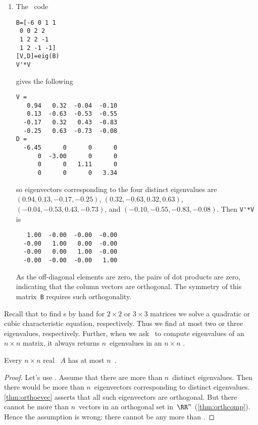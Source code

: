 \begin{example}
\begin{solution}
\begin{enumerate}
\item The \script\ code 
\setbox\ajrqrbox\hbox{}%
\marginajrbox%
\begin{verbatim}
B=[-6 0 1 1
 0 0 2 2
 1 2 2 -1
 1 2 -1 -1]
[V,D]=eig(B)
V'*V
\end{verbatim}
gives the following \twodp
\begin{verbatim}
V =
   0.94   0.32  -0.04  -0.10
   0.13  -0.63  -0.53  -0.55
  -0.17   0.32   0.43  -0.83
  -0.25   0.63  -0.73  -0.08
D =
  -6.45      0      0      0
      0  -3.00      0      0
      0      0   1.11      0
      0      0      0   3.34
\end{verbatim}
so eigenvectors corresponding to the four distinct eigenvalues are
\((0.94,0.13,-0.17,-0.25)\), \((0.32,-0.63,0.32,0.63)\), \((-0.04,-0.53,0.43,-0.73)\), and \((-0.10,-0.55,-0.83,-0.08)\).
Then \verb|V'*V| is \twodp
\begin{verbatim}
   1.00  -0.00  -0.00  -0.00
  -0.00   1.00   0.00  -0.00
  -0.00   0.00   1.00  -0.00
  -0.00  -0.00  -0.00   1.00
\end{verbatim}
As the off-diagonal elements are zero, the pairs of dot products are zero, indicating that the column vectors are orthogonal.  
The symmetry of this matrix~\verb|B| requires such orthogonality.
\aqed
\end{enumerate}
\end{solution}
\end{example}





Recall that to find s by hand for \(2\times2\) or \(3\times 3\) matrices we solve a quadratic or cubic characteristic equation, respectively.
Thus we find at most two or three eigenvalues, respectively.
Further, when we ask \script\ to compute eigenvalues of an \(n\times n\) matrix, it always returns \(n\)~eigenvalues in an \(n\times n\) .


\begin{theorem} \label{thm:lenlam}
Every \(n\times n\) real ~\(A\) has at most \(n\)~.
\end{theorem}
\begin{proof} 
Let's use . 
Assume that there are more than \(n\)~distinct eigenvalues.
Then there would be more than \(n\)~eigenvectors corresponding to distinct eigenvalues.
\cref{thm:orthoevec} asserts that all such eigenvectors are orthogonal. 
But there cannot be more than \(n\)~vectors in an orthogonal set in~\(\RR^n\) (\cref{thm:orthcomp}).
Hence the assumption is wrong: there cannot be any more than .
\end{proof}


